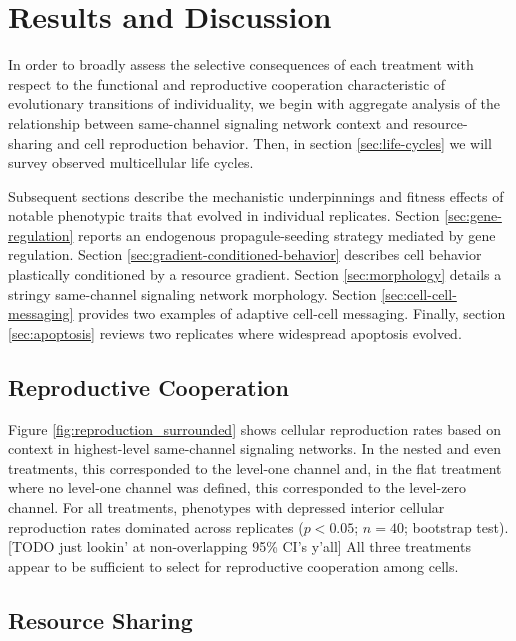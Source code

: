 \section{Results and Discussion}

In order to broadly assess the selective consequences of each treatment with respect to the functional and reproductive cooperation characteristic of evolutionary transitions of individuality, we begin with aggregate analysis of the relationship between same-channel signaling network context and resource-sharing and cell reproduction behavior.
Then, in section \ref{sec:life-cycles} we will survey observed multicellular life cycles.

Subsequent sections describe the mechanistic underpinnings and fitness effects of notable phenotypic traits that evolved in individual replicates.
Section \ref{sec:gene-regulation} reports an endogenous propagule-seeding strategy mediated by gene regulation.
Section \ref{sec:gradient-conditioned-behavior} describes cell behavior plastically conditioned by a resource gradient.
Section \ref{sec:morphology} details a stringy same-channel signaling network morphology.
Section \ref{sec:cell-cell-messaging} provides two examples of adaptive cell-cell messaging.
Finally, section \ref{sec:apoptosis} reviews two replicates where widespread apoptosis evolved.

\subsection{Reproductive Cooperation} \label{sec:reproductive-cooperation}



Figure \ref{fig:reproduction_surrounded} shows cellular reproduction rates based on context in highest-level same-channel signaling networks.
In the nested and even treatments, this corresponded to the level-one channel and, in the flat treatment where no level-one channel was defined, this corresponded to the level-zero channel.
For all treatments, phenotypes with depressed interior cellular reproduction rates dominated across replicates ($p < 0.05$; $n=40$; bootstrap test).
[TODO just lookin' at non-overlapping 95\% CI's y'all]
All three treatments appear to be sufficient to select for reproductive cooperation among cells.

\subsection{Resource Sharing} \label{sec:resource-sharing}

